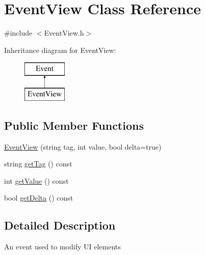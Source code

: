 \hypertarget{class_event_view}{\section{Event\+View Class Reference}
\label{class_event_view}
}


{\ttfamily \#include $<$Event\+View.\+h$>$}

Inheritance diagram for Event\+View\+:\begin{figure}[H]
\begin{center}
\leavevmode
\includegraphics[height=2.000000cm]{class_event_view}
\end{center}
\end{figure}
\subsection*{Public Member Functions}
\begin{DoxyCompactItemize}
\item 
\hyperlink{class_event_view_a6c8e67589e2b938db9139dcb6eaeabd6}{Event\+View} (string tag, int value, bool delta=true)
\item 
string \hyperlink{class_event_view_a5f737dfd3a000cb45192aa56113afd59}{get\+Tag} () const 
\item 
int \hyperlink{class_event_view_a5e7381f571d0cc269df58b1de2db5620}{get\+Value} () const 
\item 
bool \hyperlink{class_event_view_af72a798337d18edbaa8c366b1e353b85}{get\+Delta} () const 
\end{DoxyCompactItemize}


\subsection{Detailed Description}
An event used to modify U\+I elements 

